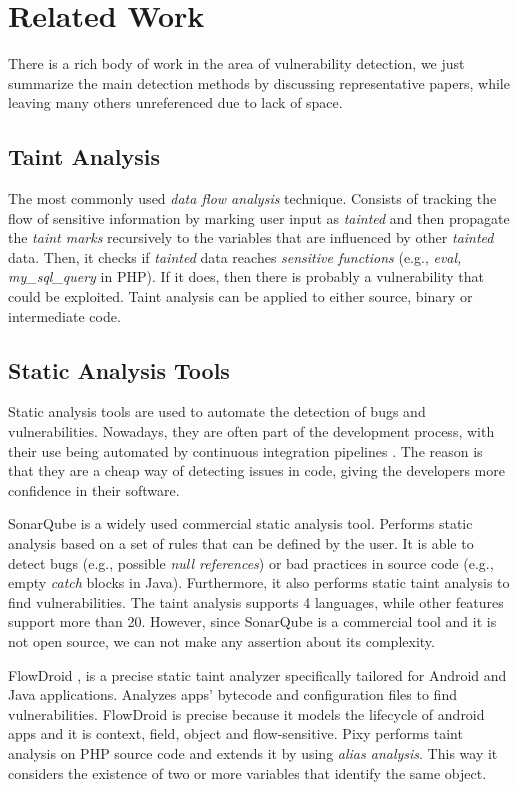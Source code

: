 \section{Related Work}
\label{relatedwork}
There is a rich body of work in the area of vulnerability detection, we just summarize the main detection methods by discussing representative papers, while leaving many others unreferenced due to lack of space. 

\subsection{Taint Analysis}
The most commonly used \textit{data flow analysis} technique. Consists of tracking the flow of sensitive information by marking user input as \textit{tainted} and then propagate the \textit{taint marks} recursively to the variables that are influenced by other \textit{tainted} data. Then, it checks if \textit{tainted} data reaches \textit{sensitive functions} (e.g., \textit{eval, my\_sql\_query} in PHP). If it does, then there is probably a vulnerability that could be exploited. Taint analysis can be applied to either source, binary or intermediate code. 



\subsection{Static Analysis Tools}
Static analysis tools are used to automate the detection of bugs and vulnerabilities. Nowadays, they are often part of the development process, with their use being automated by continuous integration pipelines \cite{mohammad2016continuous}. The reason is that they are a cheap way of detecting issues in code, giving the developers more confidence in their software. 


SonarQube \cite{campbell2013sonarqube} is a widely used commercial static analysis tool. Performs static analysis based on a set of rules that can be defined by the user. It is able to detect bugs (e.g., possible \textit{null references}) or bad practices in source code (e.g., empty \textit{catch} blocks in Java). Furthermore, it also performs static taint analysis to find vulnerabilities. The taint analysis supports 4 languages, while other features support more than 20. However, since SonarQube is a commercial tool and it is not open source, we can not make any assertion about its complexity. 

FlowDroid \cite{arzt2014flowdroid}, is a precise static taint analyzer specifically tailored for Android and Java applications. Analyzes apps' bytecode and configuration files to find vulnerabilities. FlowDroid is precise because it models the lifecycle of android apps and it is context, field, object and flow-sensitive. Pixy \cite{jovanovic2006pixy} performs taint analysis on PHP source code and extends it by using \textit{alias analysis}. This way it considers the existence of two or more variables that identify the same object.


